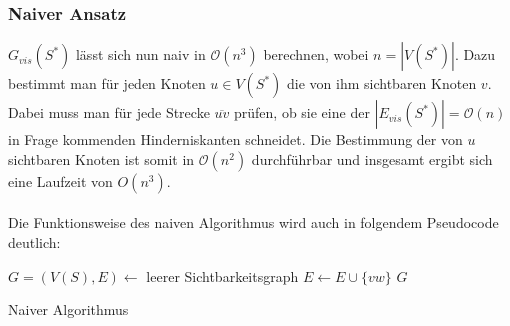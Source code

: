 \documentclass[a4paper, notitlepage, 12pt]{scrartcl}
\begin{document}
 \subsubsection{Naiver Ansatz}
 $G_{vis}(S^{*})$ lässt sich nun naiv in $\mathcal{O}(n^3)$ berechnen, wobei $n = |V(S^*)|$. Dazu bestimmt man für jeden Knoten $u \in V(S^*)$ die von ihm sichtbaren Knoten $v$. Dabei muss man für jede Strecke $\overline{uv}$ prüfen, ob sie eine der $|E_{vis}(S^*)| = \mathcal{O}(n)$ in Frage kommenden Hinderniskanten schneidet. Die Bestimmung der von $u$ sichtbaren Knoten ist somit in $\mathcal{O}(n^2)$ durchführbar und insgesamt ergibt sich eine Laufzeit von $O(n^3)$. \\ \\
 Die Funktionsweise des naiven Algorithmus wird auch in folgendem Pseudocode deutlich: 
 \begin{algorithm}[H]
 \begin{algorithmic}
 	\State $G = (V(S),E) \gets$ leerer Sichtbarkeitsgraph
 	\State $E \gets E \cup \{vw\}$
 	\EndIf
 	\EndFor
 	\EndFor
 	\EndFor
 	\State \Return $G$
 	\EndFunction
 \end{algorithmic}
\caption{Naiver Algorithmus}
\end{algorithm}
\newpage
\end{document}
